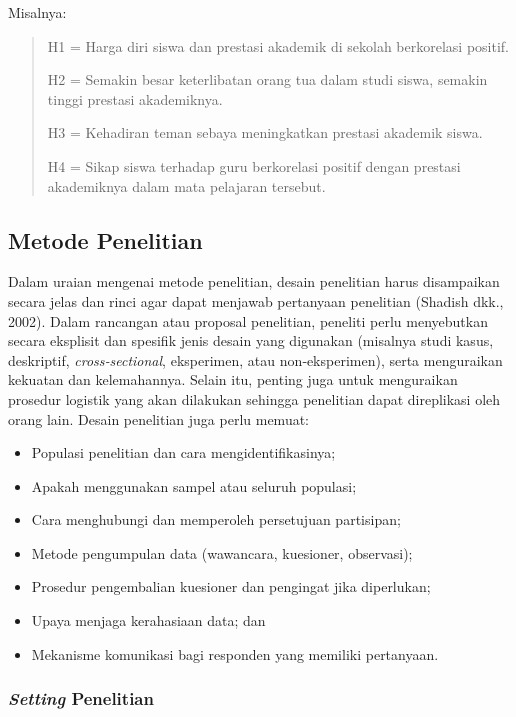 \documentclass[
  indonesian,
  letterpaper,
  DIV=11,
  numbers=noendperiod]{scrreprt}
\providecommand{\tightlist}{%
  \setlength{\itemsep}{0pt}\setlength{\parskip}{0pt}}
\begin{document}
Misalnya:

\begin{quote}
H1 = Harga diri siswa dan prestasi akademik di sekolah berkorelasi
positif.

H2 = Semakin besar keterlibatan orang tua dalam studi siswa, semakin
tinggi prestasi akademiknya.

H3 = Kehadiran teman sebaya meningkatkan prestasi akademik siswa.

H4 = Sikap siswa terhadap guru berkorelasi positif dengan prestasi
akademiknya dalam mata pelajaran tersebut.
\end{quote}

\subsection{Metode Penelitian}\label{metode-penelitian-1}

Dalam uraian mengenai metode penelitian, desain penelitian harus
disampaikan secara jelas dan rinci agar dapat menjawab pertanyaan
penelitian (Shadish dkk., 2002). Dalam rancangan atau proposal
penelitian, peneliti perlu menyebutkan secara eksplisit dan spesifik
jenis desain yang digunakan (misalnya studi kasus, deskriptif,
\emph{cross‑sectional}, eksperimen, atau non‑eksperimen), serta
menguraikan kekuatan dan kelemahannya. Selain itu, penting juga untuk
menguraikan prosedur logistik yang akan dilakukan sehingga penelitian
dapat direplikasi oleh orang lain. Desain penelitian juga perlu memuat:

\begin{itemize}
\tightlist
\item
  Populasi penelitian dan cara mengidentifikasinya;
\item
  Apakah menggunakan sampel atau seluruh populasi;
\item
  Cara menghubungi dan memperoleh persetujuan partisipan;
\item
  Metode pengumpulan data (wawancara, kuesioner, observasi);
\item
  Prosedur pengembalian kuesioner dan pengingat jika diperlukan;
\item
  Upaya menjaga kerahasiaan data; dan
\item
  Mekanisme komunikasi bagi responden yang memiliki pertanyaan.
\end{itemize}

\subsubsection{\texorpdfstring{\emph{Setting}
Penelitian}{Setting Penelitian}}\label{setting-penelitian}
\end{document}
